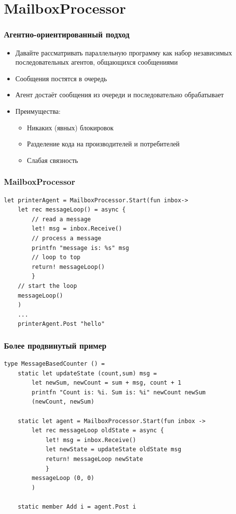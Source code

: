 \documentclass{../../slides-style}
\begin{document}
    \section{MailboxProcessor}

    \begin{frame}
        \frametitle{Агентно-ориентированный подход}
        \begin{itemize}
            \item Давайте рассматривать параллельную программу как набор независимых последовательных агентов, общающихся сообщениями
            \item Сообщения постятся в очередь
            \item Агент достаёт сообщения из очереди и последовательно обрабатывает
            \item Преимущества:
            \begin{itemize}
                \item Никаких (явных) блокировок
                \item Разделение кода на производителей и потребителей
                \item Слабая связность
            \end{itemize}
        \end{itemize}
    \end{frame}

    \begin{frame}[fragile]
        \frametitle{MailboxProcessor}
        \begin{verbatim}
let printerAgent = MailboxProcessor.Start(fun inbox->
    let rec messageLoop() = async {
        // read a message
        let! msg = inbox.Receive()
        // process a message
        printfn "message is: %s" msg
        // loop to top
        return! messageLoop()
        }
    // start the loop
    messageLoop()
    )
    ...
    printerAgent.Post "hello"
        \end{verbatim}
    \end{frame}

    \begin{frame}[fragile]
        \frametitle{Более продвинутый пример}
        \begin{verbatim}
type MessageBasedCounter () =
    static let updateState (count,sum) msg =
        let newSum, newCount = sum + msg, count + 1
        printfn "Count is: %i. Sum is: %i" newCount newSum
        (newCount, newSum)

    static let agent = MailboxProcessor.Start(fun inbox ->
        let rec messageLoop oldState = async {
            let! msg = inbox.Receive()
            let newState = updateState oldState msg
            return! messageLoop newState
            }
        messageLoop (0, 0)
        )

    static member Add i = agent.Post i
        \end{verbatim}
    \end{frame}
\end{document}
